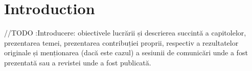 \chapter{Introduction}

\label{intro}

\par //TODO :Introducere: obiectivele lucrării și descrierea succintă a capitolelor, prezentarea temei, prezentarea contribuției proprii, respectiv a rezultatelor originale și menționarea (dacă este cazul) a sesiunii de comunicări unde a fost prezentată sau a revistei unde a fost publicată.